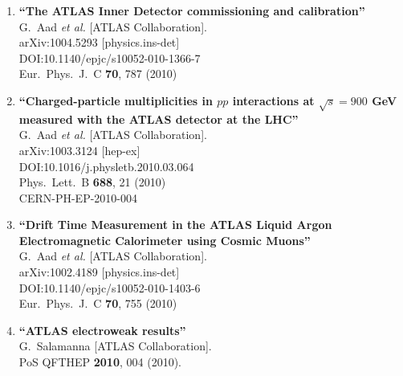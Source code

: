 \documentclass{article}
\begin{document}
\begin{enumerate}
\item%
{\bf ``The ATLAS Inner Detector commissioning and calibration''}
  \\{}G.~Aad {\it et al.} [ATLAS Collaboration].
  \\{}arXiv:1004.5293 [physics.ins-det]
  \\{}DOI:10.1140/epjc/s10052-010-1366-7
  \\{}Eur.\ Phys.\ J.\ C {\bf 70}, 787 (2010)
\item%
{\bf ``Charged-particle multiplicities in $pp$ interactions at $\sqrt{s}=900$ GeV measured with the ATLAS detector at the LHC''}
  \\{}G.~Aad {\it et al.} [ATLAS Collaboration].
  \\{}arXiv:1003.3124 [hep-ex]
  \\{}DOI:10.1016/j.physletb.2010.03.064
  \\{}Phys.\ Lett.\ B {\bf 688}, 21 (2010)
  \\{}CERN-PH-EP-2010-004
\item%
{\bf ``Drift Time Measurement in the ATLAS Liquid Argon Electromagnetic Calorimeter using Cosmic Muons''}
  \\{}G.~Aad {\it et al.} [ATLAS Collaboration].
  \\{}arXiv:1002.4189 [physics.ins-det]
  \\{}DOI:10.1140/epjc/s10052-010-1403-6
  \\{}Eur.\ Phys.\ J.\ C {\bf 70}, 755 (2010)
\item%
{\bf ``ATLAS electroweak results''}
  \\{}G.~Salamanna [ATLAS Collaboration].
  \\{}PoS QFTHEP {\bf 2010}, 004 (2010).


\end{enumerate}
\end{document}
